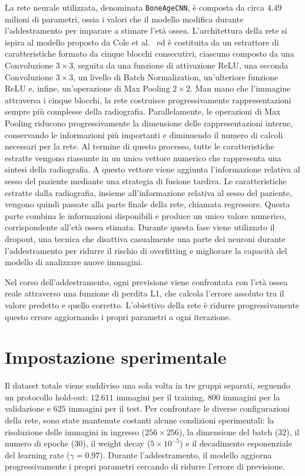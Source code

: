 \documentclass{article}
\begin{document}
La rete neurale utilizzata, denominata \texttt{BoneAgeCNN}, è composta da circa $4.49$ milioni di parametri, ossia i valori che il modello modifica durante l'addestramento per imparare a stimare l'età ossea.
L'architettura della rete si ispira al modello proposto da Cole et al.~\cite{cole2017} ed è costituita da un estrattore di caratteristiche formato da cinque blocchi consecutivi, ciascuno composto da una $\text{Convoluzione }{3\times3}$, seguita da una funzione di attivazione ReLU, una seconda $\text{Convoluzione }{3\times3}$, un livello di Batch Normalization, un'ulteriore funzione ReLU e, infine, un'operazione di Max Pooling $2\times2$. 
Man mano che l'immagine attraversa i cinque blocchi, la rete costruisce progressivamente rappresentazioni sempre più complesse della radiografia. Parallelamente, le operazioni di Max Pooling riducono progressivamente la dimensione delle rappresentazioni interne, conservando le informazioni più importanti e diminuendo il numero di calcoli necessari per la rete.
Al termine di questo processo, tutte le caratteristiche estratte vengono riassunte in un unico vettore numerico che rappresenta una sintesi della radiografia. A questo vettore viene aggiunta l'informazione relativa al sesso del paziente mediante una strategia di fusione tardiva.
Le caratteristiche estratte dalla radiografia, insieme all'informazione relativa al sesso del paziente, vengono quindi passate alla parte finale della rete, chiamata regressore. Questa parte combina le informazioni disponibili e produce un unico valore numerico, corrispondente all'età ossea stimata. Durante questa fase viene utilizzato il dropout, una tecnica che disattiva casualmente una parte dei neuroni durante l'addestramento per ridurre il rischio di overfitting e migliorare la capacità del modello di analizzare nuove immagini.

Nel corso dell'addestramento, ogni previsione viene confrontata con l'età ossea reale attraverso una funzione di perdita L1, che calcola l'errore assoluto tra il valore predetto e quello corretto. L'obiettivo della rete è ridurre progressivamente questo errore aggiornando i propri parametri a ogni iterazione.

\section{Impostazione sperimentale}

Il dataset totale viene suddiviso una sola volta in tre gruppi separati, seguendo un protocollo hold-out: $12{.}611$ immagini per il training, $800$ immagini per la validazione e $625$ immagini per il test. Per confrontare le diverse configurazioni della rete, sono state mantenute costanti alcune condizioni sperimentali: la risoluzione delle immagini in ingresso ($256\times256$), la dimensione del batch ($32$), il numero di epoche ($30$), il weight decay ($5\times10^{-5}$) e il decadimento esponenziale del learning rate ($\gamma=0.97$). Durante l'addestramento, il modello aggiorna progressivamente i propri parametri cercando di ridurre l'errore di previsione.
\end{document}
